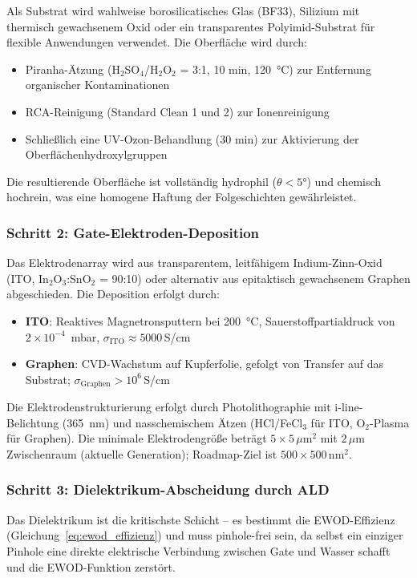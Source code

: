 ﻿\documentclass[a4paper,12pt]{scrreprt}
\theoremstyle{definition}
\begin{document}
Als Substrat wird wahlweise borosilicatisches Glas (BF33), Silizium mit
thermisch gewachsenem Oxid oder ein transparentes Polyimid-Substrat für
flexible Anwendungen verwendet. Die Oberfläche wird durch:
\begin{itemize}
	\item Piranha-Ätzung (H$_2$SO$_4$/H$_2$O$_2$ = 3:1, 10 min, 120\, °C)
	zur Entfernung organischer Kontaminationen
	\item RCA-Reinigung (Standard Clean 1 und 2) zur Ionenreinigung
	\item Schließlich eine UV-Ozon-Behandlung (30 min) zur Aktivierung
	der Oberflächenhydroxylgruppen
\end{itemize}
Die resultierende Oberfläche ist vollständig hydrophil ($\theta < 5 °$)
und chemisch hochrein, was eine homogene Haftung der Folgeschichten gewährleistet.

\subsubsection{Schritt 2: Gate-Elektroden-Deposition}

Das Elektrodenarray wird aus transparentem, leitfähigem Indium-Zinn-Oxid
(ITO, In$_2$O$_3$:SnO$_2$ = 90:10) oder alternativ aus epitaktisch
gewachsenem Graphen abgeschieden. Die Deposition erfolgt durch:
\begin{itemize}
	\item \textbf{ITO}: Reaktives Magnetronsputtern bei 200\, °C, Sauerstoffpartialdruck
	von $2 \times 10^{-4}$\, mbar, $\sigma_{\mathrm{ITO}} \approx 5000$\,S/cm
	\item \textbf{Graphen}: CVD-Wachstum auf Kupferfolie, gefolgt von Transfer
	auf das Substrat; $\sigma_{\mathrm{Graphen}} > 10^6$\,S/cm
\end{itemize}
Die Elektrodenstrukturierung erfolgt durch Photolithographie mit i-line-Belichtung
(365\, nm) und nasschemischem Ätzen (HCl/FeCl$_3$ für ITO, O$_2$-Plasma für Graphen).
Die minimale Elektrodengröße beträgt $5 \times 5$\,$\mu$m$^2$ mit $2$\,$\mu$m
Zwischenraum (aktuelle Generation); Roadmap-Ziel ist $500 \times 500$\,nm$^2$.

\subsubsection{Schritt 3: Dielektrikum-Abscheidung durch ALD}

Das Dielektrikum ist die kritischste Schicht -- es bestimmt die EWOD-Effizienz
(Gleichung~\ref{eq:ewod_effizienz}) und muss pinhole-frei sein, da selbst
ein einziger Pinhole eine direkte elektrische Verbindung zwischen Gate
und Wasser schafft und die EWOD-Funktion zerstört.
\end{document}
